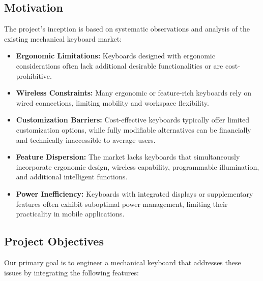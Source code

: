 \documentclass[a4paper,11pt]{article}%
\begin{document}
\subsection{Motivation}
The project's inception is based on systematic observations and analysis of the existing mechanical keyboard market:

\begin{itemize}
    \item \textbf{Ergonomic Limitations:} Keyboards designed with ergonomic considerations often lack additional desirable functionalities or are cost-prohibitive.
    \item \textbf{Wireless Constraints:} Many ergonomic or feature-rich keyboards rely on wired connections, limiting mobility and workspace flexibility.
    \item \textbf{Customization Barriers:} Cost-effective keyboards typically offer limited customization options, while fully modifiable alternatives can be financially and technically inaccessible to average users.
    \item \textbf{Feature Dispersion:} The market lacks keyboards that simultaneously incorporate ergonomic design, wireless capability, programmable illumination, and additional intelligent functions.
    \item \textbf{Power Inefficiency:} Keyboards with integrated displays or supplementary features often exhibit suboptimal power management, limiting their practicality in mobile applications.
\end{itemize}

\subsection{Project Objectives}
Our primary goal is to engineer a mechanical keyboard that addresses these issues by integrating the following features:
\end{document}
